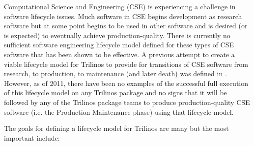 \documentclass[11pt]{SANDreport}
\begin{document}
\begin{floatingfigure}[r]{0.5\textwidth}
\begin{center}
\end{center}
\end{floatingfigure}

Computational Science and Engineering (CSE) is experiencing a
challenge in software lifecycle issues.  Much software in CSE begins
development as research software but at some point begins to be used
in other software and is desired (or is expected) to eventually
achieve production-quality.  There is currently no sufficient software
engineering lifecycle model defined for these types of CSE software
that has been shown to be effective.  A previous attempt to create a
viable lifecycle model for Trilinos to provide for transitions of CSE
software from research, to production, to maintenance (and later
death) was defined in {}\cite{TrilinosLifecycleModel2007}.  However,
as of 2011, there have been no examples of the successful full
execution of this lifecycle model on any Trilinos package and no signs
that it will be followed by any of the Trilinos package teams to
produce production-quality CSE software (i.e. the Production
Maintenance phase) using that lifecycle model.

The goals for defining a lifecycle model for Trilinos are many but the
most important include:
\end{document}
